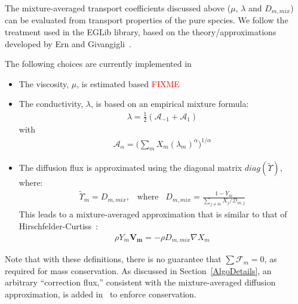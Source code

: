 The mixture-averaged transport coefficients discussed above ($\mu$, $\lambda$ and $D_{m,mix}$) can be evaluated from transport properties of the pure species. We follow the treatment used in the EGLib library, based on the theory/approximations developed by Ern and Givangigli~\cite{Ern:1994,Ern:2004}.

The following choices are currently implemented in \pelelm\ 
\begin{itemize}
\item The viscosity, $\mu$, is estimated based \textcolor{red}{FIXME}
\item The conductivity, $\lambda$, is based on an empirical mixture formula:
\begin{eqnarray}
\lambda = \frac{1}{2} (\mathcal{A}_{-1} + \mathcal{A}_{1})
\end{eqnarray}
with
\begin{eqnarray}
\mathcal{A}_{\alpha}= \Big( \sum_m X_m (\lambda_m)^{\alpha} \Big)^{1/\alpha}
\end{eqnarray}
\item The diffusion flux is approximated using the diagonal matrix $diag(\widetilde{ \Upsilon})$, where:
\begin{eqnarray}
\widetilde{ \Upsilon}_m =  D_{m,mix}, \;\;\;\mbox{where} \;\;\; D_{m,mix} = \frac{1-Y_m}{ \sum_{j \neq m} X_j / \mathcal{D}_{m,j}}
\label{eq:dmix}
\end{eqnarray}
This leads to a mixture-averaged approximation that is similar to that of Hirschfelder-Curtiss~\cite{Hirschfelder:1954}:
\begin{eqnarray*}
\rho Y_m \boldsymbol{V_m} = - \rho D_{m,mix} \nabla X_m 
\end{eqnarray*}
\end{itemize}
Note that with these definitions, there is no guarantee that $\sum \boldsymbol{\mathcal{F}}_{m} = 0$, as
required for mass conservation. As discussed in Section~\ref{AlgoDetails}, an arbitrary ``correction flux,'' consistent with the mixture-averaged diffusion approximation, is added in \pelelm\ to enforce conservation.


